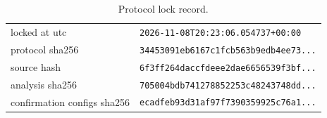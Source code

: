 \begin{table}[h]\centering\small\caption{Protocol lock record.}\label{tab:lock}
\begin{tabular}{ll}\toprule
locked at utc & \texttt{2026-11-08T20:23:06.054737+00:00}\\
protocol sha256 & \texttt{34453091eb6167c1fcb563b9edb4ee73...}\\
source hash & \texttt{6f3ff264daccfdeee2dae6656539f3bf...}\\
analysis sha256 & \texttt{705004bdb741278852253c48243748dd...}\\
confirmation configs sha256 & \texttt{ecadfeb93d31af97f7390359925c76a1...}\\
\bottomrule\end{tabular}\end{table}
